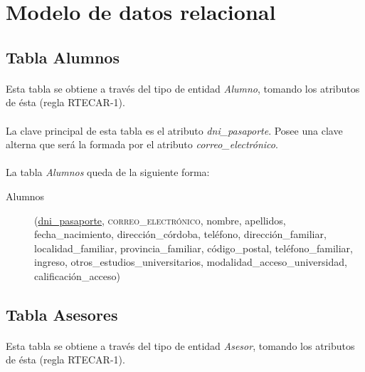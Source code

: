 \section{Modelo de datos relacional}

   \subsection{Tabla Alumnos}

      \paragraph{}Esta tabla se obtiene a través del tipo de entidad
      \textit{Alumno}, tomando los atributos de ésta (regla RTECAR-1).

      \paragraph{}La clave principal de esta tabla es el atributo
      \textit{dni\_pasaporte}. Posee una clave alterna que será la formada por
      el atributo \textit{correo\_electrónico}.

      \paragraph{}La tabla \textit{Alumnos} queda de la siguiente forma:

      \begin{description}
         \item[Alumnos] \begin{flushleft}(\underline{dni\_pasaporte},
         \textsc{correo\_electrónico}, nombre, apellidos, fecha\_nacimiento,
         dirección\_córdoba, teléfono, dirección\_familiar, localidad\_familiar,
         provincia\_familiar, código\_postal, teléfono\_familiar, ingreso,
         otros\_estudios\_universitarios, modalidad\_acceso\_universidad,
         calificación\_acceso)\end{flushleft}
      \end{description}

   \subsection{Tabla Asesores}

      \paragraph{}Esta tabla se obtiene a través del tipo de entidad
      \textit{Asesor}, tomando los atributos de ésta (regla RTECAR-1).

